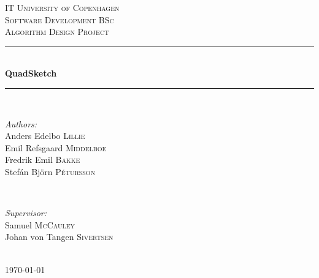 \documentclass{article}
\begin{document}
%
\begin{titlepage}
	
	\newcommand{\HRule}{\rule{\linewidth}{0.5mm}} %
	
	\center %
	
	\textsc{\LARGE IT University of Copenhagen}\\[1.5cm] %
	\textsc{\Large Software Development BSc}\\[0.5cm] %
	\textsc{\large Algorithm Design Project}\\[0.5cm] %
	
	\HRule \\[0.4cm]
	{ \huge \bfseries QuadSketch}\\[0.4cm] %
	\HRule \\[1.5cm]
	
	\begin{minipage}{0.5\textwidth}
		\begin{flushleft} \large
			\emph{Authors:}\\
			Anders Edelbo \textsc{Lillie} \\
			Emil Refsgaard \textsc{Middelboe} \\
			Fredrik Emil \textsc{Bakke} \\
			Stefán Björn \textsc{Pétursson}
		\end{flushleft}
	\end{minipage}
	~
	\begin{minipage}{0.4\textwidth}
		\begin{flushright} \large
			\emph{Supervisor:} \\
			Samuel \textsc{McCauley} \\
			Johan von Tangen \textsc{Sivertsen}
		\end{flushright}
	\end{minipage}\\[4cm]
	
	{\large \today}\\[3cm] 
	
	\vfill %
	
\end{titlepage}

\begin{abstract}
\end{abstract}
\clearpage

\tableofcontents
\clearpage
{} %
	




%
\clearpage



 
\clearpage

\appendix

	
\end{document}
